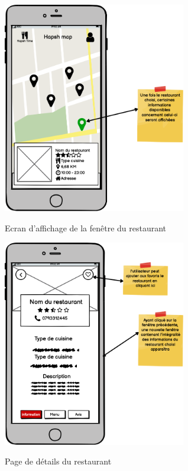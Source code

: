 \begin{figure}[!h]
    \centering
    \includegraphics[width=8cm]{images/Chapitre3/maquettes_balsamiq/Restaurant_card.png}
    \label{fig:restocard}
    \caption{Ecran d'affichage de la fenêtre du restaurant}
\end{figure} 
\newpage
\begin{figure}[!h]
    \centering
    \includegraphics[width=8cm]{images/Chapitre3/maquettes_balsamiq/Page_restaurant.png}
    \label{fig:pageresto}
    \caption{Page de détails du restaurant}
\end{figure} 
